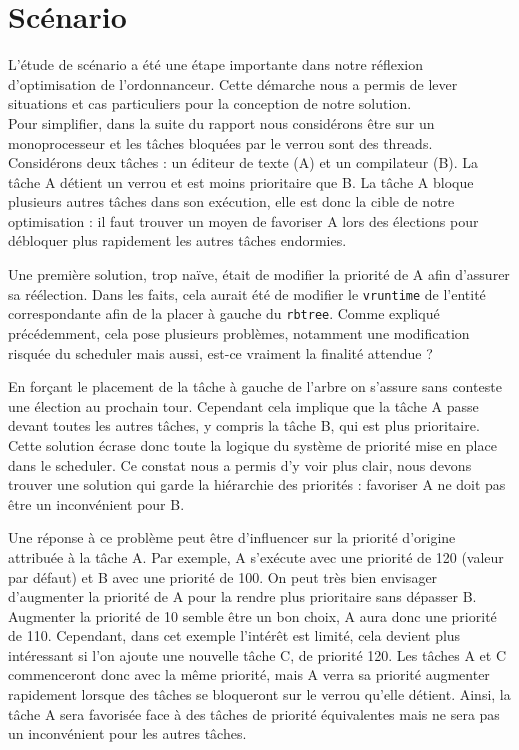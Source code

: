 \section*{Scénario}

L'étude de scénario a été une étape importante dans notre réflexion d'optimisation de l'ordonnanceur. Cette démarche nous a permis de lever situations et cas particuliers pour la conception de notre solution.
\\

Pour simplifier, dans la suite du rapport nous considérons être sur un monoprocesseur et les tâches bloquées par le verrou sont des threads.
\\

Considérons deux tâches : un éditeur de texte (A) et un compilateur (B). La 
tâche A détient un verrou et est moins prioritaire que B. La tâche A bloque 
plusieurs autres tâches dans son exécution, elle est donc la cible de notre 
optimisation : il faut trouver un moyen de favoriser A lors des élections pour 
débloquer plus rapidement les autres tâches endormies.

Une première solution, trop naïve, était de modifier la priorité de A afin 
d'assurer sa réélection. Dans les faits, cela aurait été de modifier le 
\verb|vruntime| de l'entité correspondante afin de la placer à gauche du 
\verb|rbtree|. Comme expliqué précédemment, cela pose plusieurs problèmes, 
notamment une modification risquée du scheduler mais aussi, est-ce vraiment la 
finalité attendue ?

En forçant le placement de la tâche à gauche de l'arbre on s'assure sans 
conteste une élection au prochain tour. Cependant cela implique que la tâche 
A passe devant toutes les autres tâches, y compris la tâche B, qui est plus 
prioritaire. Cette solution écrase donc toute la logique du système de priorité 
mise en place dans le scheduler. Ce constat nous a permis d'y voir plus clair, 
nous devons trouver une solution qui garde la hiérarchie des priorités : 
favoriser A ne doit pas être un inconvénient pour B.

Une réponse à ce problème peut être d'influencer sur la priorité d'origine 
attribuée à la tâche A. Par exemple, A s'exécute avec une priorité de 120 
(valeur par défaut) et B avec une priorité de 100. On peut très bien envisager 
d'augmenter la priorité de A pour la rendre plus prioritaire sans dépasser B. 
Augmenter la priorité de 10 semble être un bon choix, A aura donc une priorité 
de 110. Cependant, dans cet exemple l'intérêt est limité, cela devient plus 
intéressant si l'on ajoute une nouvelle tâche C, de priorité 120. Les tâches A 
et C commenceront donc avec la même priorité, mais A verra sa priorité augmenter
rapidement lorsque des tâches se bloqueront sur le verrou qu'elle détient. 
Ainsi, la tâche A sera favorisée face à des tâches de priorité équivalentes mais
ne sera pas un inconvénient pour les autres tâches.

